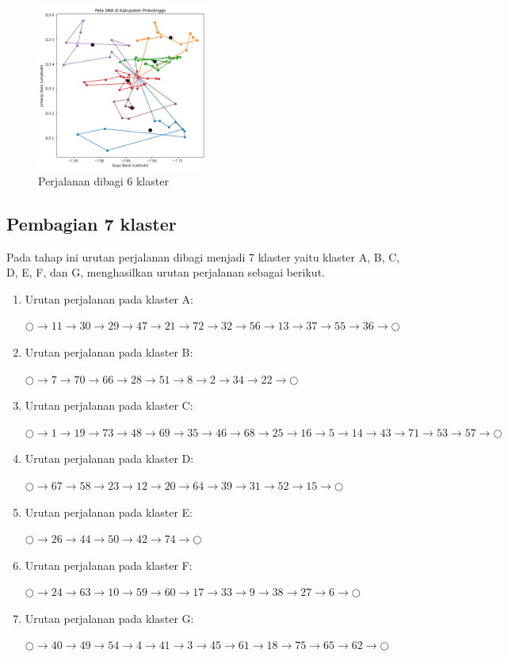 \begin{figure}[H]
\centering
\includegraphics[width=0.5\textwidth]{Gambar/hasil_mtsp/6}
\caption{Perjalanan dibagi 6 klaster}
\label{fig:hasil_mtsp6}
\end{figure}

\subsection{Pembagian 7 klaster}

Pada tahap ini urutan perjalanan dibagi menjadi 7 klaster yaitu klaster A, B, C, D, E, F, dan G, menghasilkan urutan perjalanan sebagai berikut.

\begin{enumerate}

\item Urutan perjalanan pada klaster A:

$\bigcirc \to 11 \to 30 \to 29 \to 47 \to 21 \to 72 \to 32 \to 56 \to 13 \to 37 \to 55 \to 36 \to \bigcirc$

\item Urutan perjalanan pada klaster B:

$\bigcirc \to 7 \to 70 \to 66 \to 28 \to 51 \to 8 \to 2 \to 34 \to 22 \to \bigcirc$

\item Urutan perjalanan pada klaster C:

$\bigcirc \to 1 \to 19 \to 73 \to 48 \to 69 \to 35 \to 46 \to 68 \to 25 \to 16 \to 5 \to 14 \to 43 \to 71 \to 53 \to 57 \to \bigcirc$

\item Urutan perjalanan pada klaster D:

$\bigcirc \to 67 \to 58 \to 23 \to 12 \to 20 \to 64 \to 39 \to 31 \to 52 \to 15 \to \bigcirc$

\item Urutan perjalanan pada klaster E:

$\bigcirc \to 26 \to 44 \to 50 \to 42 \to 74 \to \bigcirc$

\item Urutan perjalanan pada klaster F:

$\bigcirc \to 24 \to 63 \to 10 \to 59 \to 60 \to 17 \to 33 \to 9 \to 38 \to 27 \to 6 \to \bigcirc$

\item Urutan perjalanan pada klaster G:

$\bigcirc \to 40 \to 49 \to 54 \to 4 \to 41 \to 3 \to 45 \to 61 \to 18 \to 75 \to 65 \to 62 \to \bigcirc$

\end{enumerate}

